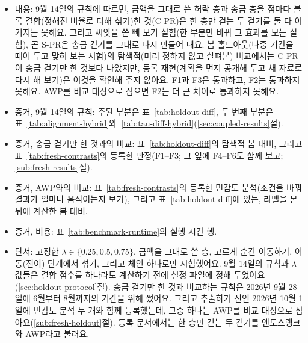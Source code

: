 \begin{itemize}
\item 내용: 9월 14일의 규칙에 따르면, 금액을 그대로 쓴 허락 층과 송금 층을 점마다 볼록 결합(정해진 비율로 더해 섞기)한 것(C-PR)은 한 층만 걷는 두 걷기를 둘 다 이기지는 못해요. 그리고 씨앗을 쓴 빼 보기 실험(한 부분만 바꿔 그 효과를 보는 실험), 곧 S-PR은 송금 걷기를 그대로 다시 만들어 내요. 봄 홀드아웃(나중 기간을 떼어 두고 맞혀 보는 시험)의 탐색적(미리 정하지 않고 살펴본) 비교에서는 C-PR이 송금 걷기만 한 것보다 나았지만, 등록 재현(계획을 먼저 공개해 두고 새 자료로 다시 해 보기)은 이것을 확인해 주지 않아요. F1과 F3은 통과하고, F2는 통과하지 못해요. AWP를 비교 대상으로 삼으면 F2는 더 큰 차이로 통과하지 못해요.
\item 증거, 9월 14일의 규칙: 주된 부분은 표~\ref{tab:holdout-diff}, 두 번째 부분은 표~\ref{tab:alignment-hybrid}와~\ref{tab:tau-diff-hybrid}(\ref{sec:coupled-results}절).
\item 증거, 송금 걷기만 한 것과의 비교: 표~\ref{tab:holdout-diff}의 탐색적 봄 대비, 그리고 표~\ref{tab:fresh-contrasts}의 등록한 판정(F1--F3; 그 옆에 F4--F6도 함께 보고; \ref{sub:fresh-results}절).
\item 증거, AWP와의 비교: 표~\ref{tab:fresh-contrasts}의 등록한 민감도 분석(조건을 바꿔 결과가 얼마나 움직이는지 보기), 그리고 표~\ref{tab:holdout-diff}에 있는, 라벨을 본 뒤에 계산한 봄 대비.
\item 증거, 비용: 표~\ref{tab:benchmark-runtime}의 실행 시간 행.
\item 단서: 고정한 $\lambda\in\{0.25,0.5,0.75\}$, 금액을 그대로 쓴 층, 고르게 순간 이동하기, 이동(전이) 단계에서 섞기, 그리고 체인 하나로만 시험했어요. 9월 14일의 규칙과 $\lambda$ 값들은 결합 점수를 하나라도 계산하기 전에 설정 파일에 정해 두었어요(\ref{sec:holdout-protocol}절). 송금 걷기만 한 것과 비교하는 규칙은 2026년 9월 28일에 6월부터 8월까지의 기간을 위해 썼어요. 그리고 추출하기 전인 2026년 10월 1일에 민감도 분석 두 개와 함께 등록했는데, 그중 하나는 AWP를 비교 대상으로 삼아요(\ref{sub:fresh-holdout}절). 등록 문서에서는 한 층만 걷는 두 걷기를 엔도스랭크와 AWP라고 불러요.
\end{itemize}


